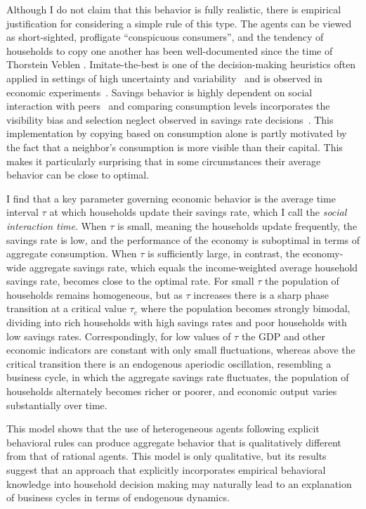 Although I do not claim that this behavior is fully realistic, there is empirical justification for considering a simple rule of this type.  The agents can be viewed as short-sighted, profligate ``conspicuous consumers'', and the tendency of households to copy one another has been well-documented since the time of Thorstein Veblen \citep{veblen1899}.  Imitate-the-best is one of the decision-making heuristics often applied in settings of high uncertainty and variability~\citep{Gigerenzer2011} and is observed in economic experiments~\citep{Traulsen2010}.  Savings behavior is highly dependent on social interaction with peers~\citep{Lu2011,Zhang2018,Kaustia2012, cascades} and comparing consumption levels incorporates the visibility bias and selection neglect observed in savings rate decisions~\citep{enke2015you}.  This implementation by copying based on consumption alone is partly motivated by the fact that a neighbor's consumption is more visible than their capital.    This makes it particularly surprising that in some circumstances their average behavior can be close to optimal.

I find that a key parameter governing economic behavior is the average time interval $\tau$ at which households update their savings rate, which I call the \textit{social interaction time}.  When $\tau$ is small, meaning the households update frequently, the savings rate is low, and the performance of the economy is suboptimal in terms of aggregate consumption. When $\tau$ is sufficiently large, in contrast, the economy-wide aggregate savings rate, which equals the income-weighted average household savings rate, becomes close to the optimal rate.  For small $\tau$ the population of households remains homogeneous, but as $\tau$ increases there is a sharp phase transition at a critical value $\tau_{c}$ where the population becomes strongly bimodal, dividing into rich households with high savings rates and poor households with low savings rates.  Correspondingly, for low values of $\tau$ the GDP and other economic indicators are constant with only small fluctuations, whereas above the critical transition there is an endogenous aperiodic oscillation, resembling a business cycle, in which the aggregate savings rate fluctuates, the population of households alternately becomes richer or poorer, and economic output varies substantially over time.  

This model shows that the use of heterogeneous agents following explicit behavioral rules can produce aggregate behavior that is qualitatively different from that of rational agents. This model is only qualitative, but its results suggest that an approach that explicitly incorporates empirical behavioral knowledge into household decision making may naturally lead to an explanation of business cycles in terms of endogenous dynamics. 
\newpage

